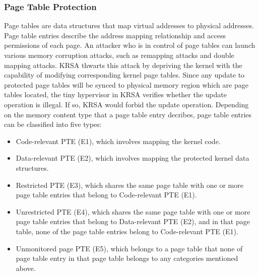 \documentclass[conference]{IEEEtran}
\begin{document}
\subsubsection{Page Table Protection} \label{sec:ptdesign}
Page tables are data structures that map virtual addresses to physical addresses. 
Page table entries describe the address mapping relationship and access permissions of each page. 
An attacker who is in control of page tables can launch various memory corruption attacks, such as remapping attacks and double mapping attacks. 
KRSA thwarts this attack by depriving the kernel with the capability of modifying corresponding kernel page tables. Since any update to protected page tables will be synced to physical memory region which are page tables located, the tiny hypervisor in KRSA verifies whether the update operation is illegal. If so, KRSA would forbid the update operation. 
Depending on the memory content type that a page table entry decribes, page table entries can be classified into five types: 
\begin{itemize}
\item Code-relevant PTE (E1), which involves mapping the kernel code. 
\item Data-relevant PTE (E2), which involves mapping the protected kernel data structures. 
\item Restricted PTE (E3), which shares the same page table with one or more page table entries that belong to Code-relevant PTE (E1).
\item Unrestricted PTE (E4), which shares the same page table with one or more page table entries that belong to Data-relevant PTE (E2), and in that page table, none of the page table entries belong to Code-relevant PTE (E1).
\item Unmonitored page PTE (E5), which belongs to a page table that none of page table entry in that page table belongs to any categories mentioned above. 
\end{itemize}
%
\end{document}
